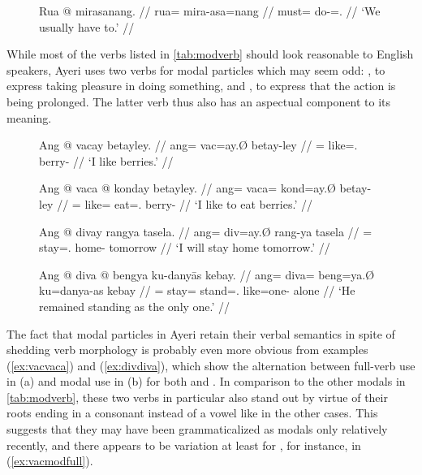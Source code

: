 \begin{figure}[h]
\ex\label{ex:modaldummy}\ljudge\ques\begingl
	\gla Rua @ mirasanang. //
	\glb rua= mira-asa=nang //
	\glc must= do-\Hab{}=\Fpl{}.\Aarg{} //
	\glft `We usually have to.' //
\endgl\xe
\end{figure}

While most of the verbs listed in \autoref{tab:modverb} should look reasonable
to English speakers, Ayeri uses two verbs for modal particles which may seem
odd: , to express taking pleasure in doing something,
and , to express that the action is being
prolonged. The latter verb thus also has an aspectual component to its meaning.

\begin{figure}[h]
\pex\label{ex:vacvaca}
\a\label{ex:vacfull}\begingl
	\gla Ang @ vacay betayley. //
	\glb ang= vac=ay.Ø betay-ley //
	\glc \AgtT{}= like=\Fsg{}.\Top{} berry-\PargI{} //
	\glft `I like berries.' //
\endgl

\a\label{ex:vacamod}\begingl
	\gla Ang @ vaca @ konday betayley. //
	\glb ang= vaca= kond=ay.Ø betay-ley //
	\glc \AgtT{}= like= eat=\Fsg{}.\Top{} berry-\PargI{} //
	\glft `I like to eat berries.' //
\endgl
\xe
\end{figure}

\begin{figure}[h]
\pex\label{ex:divdiva}
\a\label{ex:divfull}\begingl
	\gla Ang @ divay rangya tasela. //
	\glb ang= div=ay.Ø rang-ya tasela //
	\glc \AgtT{}= stay=\Fsg{}.\Top{} home-\Loc{} tomorrow //
	\glft `I will stay home tomorrow.' //
\endgl

\a\label{ex:divamod}\begingl
	\gla Ang @ diva @ bengya ku-danyās kebay. //
	\glb ang= diva= beng=ya.Ø ku=danya-as kebay //
	\glc \AgtT{}= stay= stand=\TsgM{}.\Top{} like=one-\Parg{} alone //
	\glft `He remained standing as the only one.' //
\endgl
\xe
\end{figure}

The fact that modal particles in Ayeri retain their verbal semantics in spite
of shedding verb morphology is probably even more obvious from examples
(\ref{ex:vacvaca}) and (\ref{ex:divdiva}), which show the alternation between
full-verb use in (a) and modal use in (b) for both  and
. In comparison to the other modals in 
\autoref{tab:modverb}, these two verbs in particular also stand out by virtue 
of their roots ending in a consonant instead of a vowel like in the other 
cases. This suggests that they may have been grammaticalized as modals 
only relatively recently, and there appears to be variation at least for 
, for instance, in (\ref{ex:vacmodfull}).

